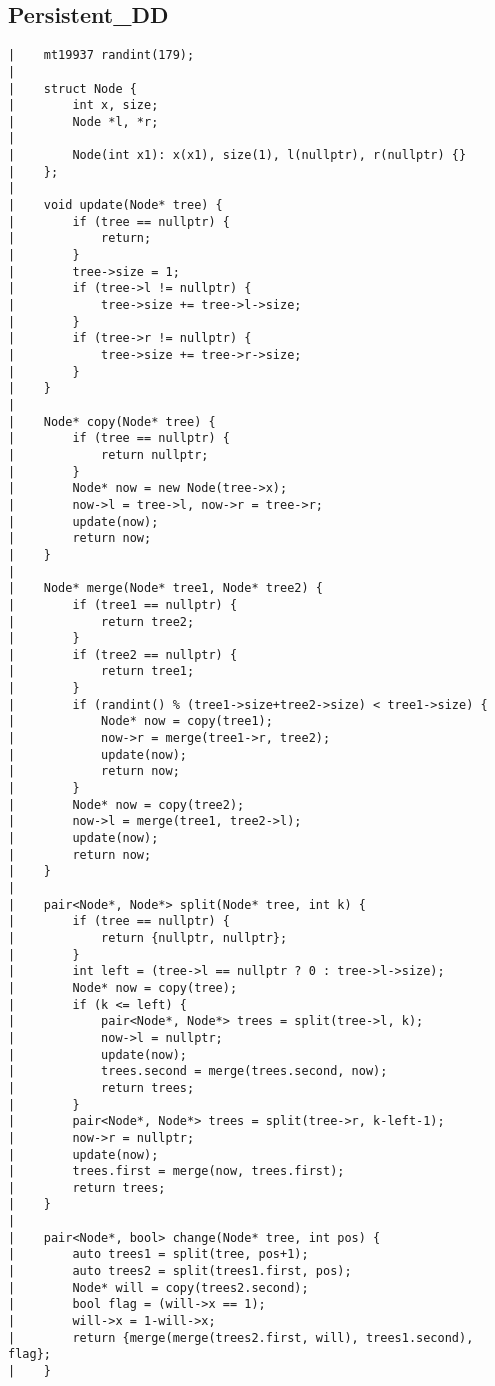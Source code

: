 \documentclass[a4paper, 10pt]{article}
\begin{document}
\begin{center}
\section*{Persistent\_DD}
\begin{verbatim}
|    mt19937 randint(179);
|    
|    struct Node {
|        int x, size;
|        Node *l, *r;
|    
|        Node(int x1): x(x1), size(1), l(nullptr), r(nullptr) {}
|    };
|    
|    void update(Node* tree) {
|        if (tree == nullptr) {
|            return;
|        }
|        tree->size = 1;
|        if (tree->l != nullptr) {
|            tree->size += tree->l->size;
|        }
|        if (tree->r != nullptr) {
|            tree->size += tree->r->size;
|        }
|    }
|    
|    Node* copy(Node* tree) {
|        if (tree == nullptr) {
|            return nullptr;
|        }
|        Node* now = new Node(tree->x);
|        now->l = tree->l, now->r = tree->r;
|        update(now);
|        return now;
|    }
|    
|    Node* merge(Node* tree1, Node* tree2) {
|        if (tree1 == nullptr) {
|            return tree2;
|        }
|        if (tree2 == nullptr) {
|            return tree1;
|        }
|        if (randint() % (tree1->size+tree2->size) < tree1->size) {
|            Node* now = copy(tree1);
|            now->r = merge(tree1->r, tree2);
|            update(now);
|            return now;
|        }
|        Node* now = copy(tree2);
|        now->l = merge(tree1, tree2->l);
|        update(now);
|        return now;
|    }
|    
|    pair<Node*, Node*> split(Node* tree, int k) {
|        if (tree == nullptr) {
|            return {nullptr, nullptr};
|        }
|        int left = (tree->l == nullptr ? 0 : tree->l->size);
|        Node* now = copy(tree);
|        if (k <= left) {
|            pair<Node*, Node*> trees = split(tree->l, k);
|            now->l = nullptr;
|            update(now);
|            trees.second = merge(trees.second, now);
|            return trees;
|        }
|        pair<Node*, Node*> trees = split(tree->r, k-left-1);
|        now->r = nullptr;
|        update(now);
|        trees.first = merge(now, trees.first);
|        return trees;
|    }
|    
|    pair<Node*, bool> change(Node* tree, int pos) {
|        auto trees1 = split(tree, pos+1);
|        auto trees2 = split(trees1.first, pos);
|        Node* will = copy(trees2.second);
|        bool flag = (will->x == 1);
|        will->x = 1-will->x;
|        return {merge(merge(trees2.first, will), trees1.second), flag};
|    }
\end{verbatim}


\end{center}
\end{document}
